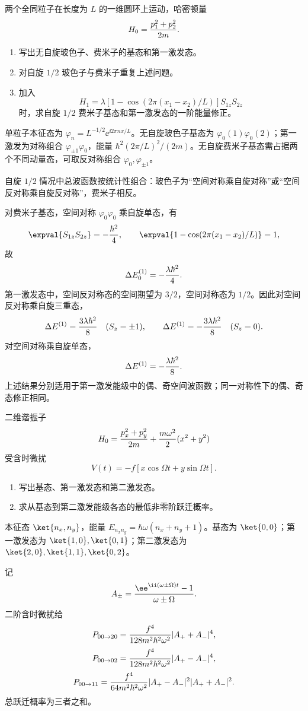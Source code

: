\begin{question}
两个全同粒子在长度为 $L$ 的一维圆环上运动，哈密顿量
\[
  H_0={p_1^2+p_2^2\over2m}.
\]
\begin{enumerate}
  \item 写出无自旋玻色子、费米子的基态和第一激发态。
  \item 对自旋 $1/2$ 玻色子与费米子重复上述问题。
  \item 加入
  \[
  H_1=\lambda[1-\cos(2\pi(x_1-x_2)/L)]S_{1z}S_{2z}
  \]
  时，求自旋 $1/2$ 费米子基态和第一激发态的一阶能量修正。
\end{enumerate}
\begin{solution}
单粒子本征态为 $\varphi_n=L^{-1/2}\ee^{\ii2\pi nx/L}$。无自旋玻色子基态为 $\varphi_0(1)\varphi_0(2)$；第一激发为对称组合 $\varphi_{\pm1}\varphi_0$，能量 $\hbar^2(2\pi/L)^2/(2m)$。无自旋费米子基态需占据两个不同动量态，可取反对称组合 $\varphi_0,\varphi_{\pm1}$。

自旋 $1/2$ 情况中总波函数按统计性组合：玻色子为“空间对称乘自旋对称”或“空间反对称乘自旋反对称”，费米子相反。

对费米子基态，空间对称 $\varphi_0\varphi_0$ 乘自旋单态，有
\[
  \expval{S_{1z}S_{2z}}=-{\hbar^2\over4},\qquad
  \expval{1-\cos(2\pi(x_1-x_2)/L)}=1,
\]
故
\[
  \Delta E_0^{(1)}=-{\lambda\hbar^2\over4}.
\]
第一激发态中，空间反对称态的空间期望为 $3/2$，空间对称态为 $1/2$。因此对空间反对称乘自旋三重态，
\[
  \Delta E^{(1)}={3\lambda\hbar^2\over8}\quad(S_z=\pm1),
  \qquad
  \Delta E^{(1)}=-{3\lambda\hbar^2\over8}\quad(S_z=0).
\]
对空间对称乘自旋单态，
\[
  \Delta E^{(1)}=-{\lambda\hbar^2\over8}.
\]
上述结果分别适用于第一激发能级中的偶、奇空间波函数；同一对称性下的偶、奇态修正相同。
\end{solution}
\end{question}

\begin{question}
二维谐振子
\[
  H_0={p_x^2+p_y^2\over2m}+{m\omega^2\over2}(x^2+y^2)
\]
受含时微扰
\[
  V(t)=-f[x\cos\Omega t+y\sin\Omega t].
\]
\begin{enumerate}
  \item 写出基态、第一激发态和第二激发态。
  \item 求从基态到第二激发能级各态的最低非零阶跃迁概率。
\end{enumerate}
\begin{solution}
本征态 $\ket{n_x,n_y}$，能量 $E_{n_xn_y}=\hbar\omega(n_x+n_y+1)$。基态为 $\ket{0,0}$；第一激发态为 $\ket{1,0},\ket{0,1}$；第二激发态为 $\ket{2,0},\ket{1,1},\ket{0,2}$。

记
\[
  A_\pm={\ee^{\ii(\omega\pm\Omega)t}-1\over\omega\pm\Omega}.
\]
二阶含时微扰给
\[
  P_{00\to20}={f^4\over128m^2\hbar^2\omega^2}|A_++A_-|^4,
\]
\[
  P_{00\to02}={f^4\over128m^2\hbar^2\omega^2}|A_+-A_-|^4,
\]
\[
  P_{00\to11}={f^4\over64m^2\hbar^2\omega^2}|A_+-A_-|^2|A_++A_-|^2.
\]
总跃迁概率为三者之和。
\end{solution}
\end{question}
